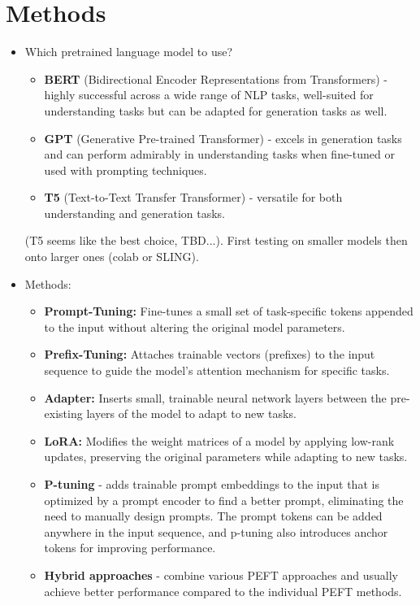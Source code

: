 \documentclass[fleqn,moreauthors,10pt]{ds_report}
\begin{document}

\section*{Methods}
\begin{itemize}
    \item Which pretrained language model to use?
    \begin{itemize}
        \item \textbf{BERT} (Bidirectional Encoder Representations from Transformers) - highly successful across a wide range of NLP tasks, well-suited for understanding tasks but can be adapted for generation tasks as well.
        \item \textbf{GPT} (Generative Pre-trained Transformer) - excels in generation tasks and can perform admirably in understanding tasks when fine-tuned or used with prompting techniques.
        \item \textbf{T5} (Text-to-Text Transfer Transformer) - versatile for both understanding and generation tasks.
    \end{itemize} 
    
    (T5 seems like the best choice, TBD...). First testing on smaller models then onto larger ones (colab or SLING).
    
    \item Methods: 
    \begin{itemize}
        \item \textbf{Prompt-Tuning:} Fine-tunes a small set of task-specific tokens appended to the input without altering the original model parameters.
        \item \textbf{Prefix-Tuning:} Attaches trainable vectors (prefixes) to the input sequence to guide the model's attention mechanism for specific tasks.
        \item \textbf{Adapter:} Inserts small, trainable neural network layers between the pre-existing layers of the model to adapt to new tasks.
        \item \textbf{LoRA:} Modifies the weight matrices of a model by applying low-rank updates, preserving the original parameters while adapting to new tasks.
        \item \textbf{P-tuning} - adds trainable prompt embeddings to the input that is optimized by a prompt encoder to find a better prompt, eliminating the need to manually design prompts. The prompt tokens can be added anywhere in the input sequence, and p-tuning also introduces anchor tokens for improving performance.
        \item \textbf{Hybrid approaches} - combine various PEFT approaches and usually achieve better performance compared to the individual PEFT methods.
     \end{itemize}
    

\end{itemize}
\end{document}
